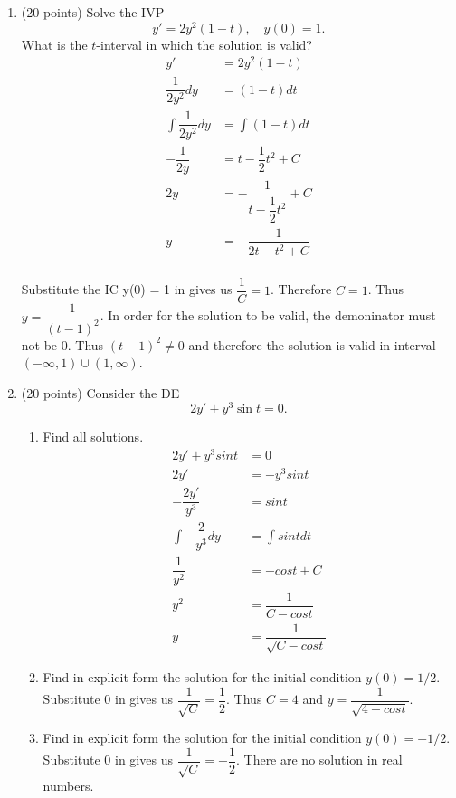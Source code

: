 \documentclass{article}
\newcommand{\benum}{\begin{enumerate}}
\newcommand{\eenum}{\end{enumerate}}
\newcommand{\nc}{\normalcolor}
\begin{document}
\begin{enumerate}

\item (20 points)  Solve the IVP
\begin{equation*}
y'=2y^2(1-t), \quad y(0)=1.
\end{equation*}
What is the $t$-interval in which the solution is valid?
\nc
\\

\begin{align*}
	y' &= 2y^2(1-t)\\
	\dfrac{1}{2y^2} dy &= (1-t) dt\\
	\int \dfrac{1}{2y^2} dy &= \int (1-t) dt\\
	-\dfrac{1}{2y} & = t - \dfrac{1}{2}t^2+C\\
	2y &= - \dfrac{1}{t-\dfrac{1}{2}t^2}+C\\
	y &= - \dfrac{1}{2t-t^2+C}\\
\end{align*}

Substitute the IC y(0) = 1 in gives us $\dfrac{1}{C} = 1$. Therefore $C = 1$. Thus $y =  \dfrac{1}{(t-1)^2}$. In order for the solution to be valid, the demoninator must not be 0. Thus $(t-1)^2 \neq 0$ and therefore the solution is valid in interval $(-\infty,1)\cup(1,\infty)$.

\newpage
\item (20 points) Consider the DE 
\begin{equation*}
2y' + y^3 \sin t = 0. 
\end{equation*}
\benum
\item Find all solutions.
\begin{align*}
	2y'+y^3sint &= 0\\
	2y' &= -y^3sint\\
	-\dfrac{2y'}{y^3} &= sint\\
	\int -\dfrac{2}{y^3}dy &= \int sint dt\\
	\dfrac{1}{y^2} &= -cost+C\\
	y^2 &= \dfrac{1}{C-cost}\\
	y &= \dfrac{1}{\sqrt{C-cost}}
\end{align*}
\item Find in explicit form the solution for the initial condition $y(0) = 1/2.$
 Substitute 0 in gives us $\dfrac{1}{\sqrt{C}} = \dfrac{1}{2}$. Thus $C = 4$ and $y = \dfrac{1}{\sqrt{4-cost}}$.
\item Find in explicit form the solution for the initial condition $y(0) = -1/2.$
 Substitute 0 in gives us $\dfrac{1}{\sqrt{C}} = -\dfrac{1}{2}$. There are no solution in real numbers.
\eenum


\end{enumerate}
\end{document}
